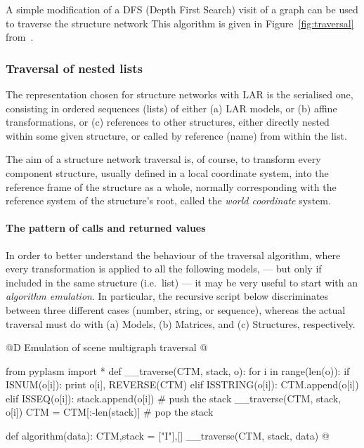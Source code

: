 \documentclass[11pt,oneside]{article}	%
\begin{document}
A simple modification of a DFS (Depth First Search) visit of a graph can be used to traverse the structure network This algorithm is given in Figure~\ref{fig:traversal} from~\cite{Paoluzzi2003a}. 

\subsubsection{Traversal of nested lists}

The representation chosen for structure networks with LAR is the serialised one, consisting in ordered sequences (lists) of either (a) LAR models, or (b) affine transformations, or (c) references to other structures, either directly nested within some given structure, or called by reference (name) from within the list.

The aim of a structure network traversal is, of course, to transform every component structure, usually defined in a local coordinate system, into the reference frame of the structure as a whole, normally corresponding with the reference system of the structure's root, called the \emph{world coordinate} system.

\paragraph{The pattern of calls and returned values}

In order to better understand the behaviour of the traversal algorithm, where every transformation is applied to all the following models, --- but only if included in the same structure  (i.e.~list) --- it may be very useful to start with an \emph{algorithm emulation}. In particular, the recursive script below discriminates between three different cases (number, string, or sequence), whereas the actual traversal must do with (a) Models, (b) Matrices, and (c) Structures, respectively.

@D Emulation of scene multigraph traversal
@{from pyplasm import *
def __traverse(CTM, stack, o):
    for i in range(len(o)):
        if ISNUM(o[i]): print o[i], REVERSE(CTM)
        elif ISSTRING(o[i]): 
            CTM.append(o[i])
        elif ISSEQ(o[i]):
            stack.append(o[i])				# push the stack
            __traverse(CTM, stack, o[i])
            CTM = CTM[:-len(stack)] 		# pop the stack

def algorithm(data):
    CTM,stack = ["I"],[]
    __traverse(CTM, stack, data)  
@}
\end{document}

